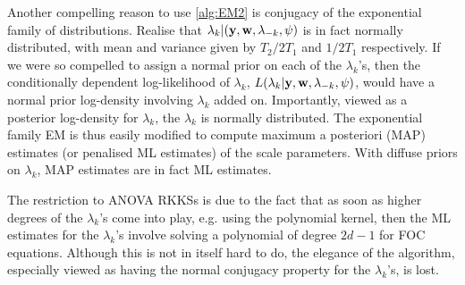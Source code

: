 \begin{remark}
  Another compelling reason to use \cref{alg:EM2} is conjugacy of the exponential family of distributions.
  Realise that $\lambda_k|({\mathbf y},{\mathbf w},\lambda_{-k},\psi)$ is in fact normally distributed, with mean and variance given by $T_2/2T_1$ and $1/2T_1$ respectively.
  If we were so compelled to assign a normal prior on each of the $\lambda_k$'s, then the conditionally dependent log-likelihood of $\lambda_k$, $L(\lambda_k|{\mathbf y},{\mathbf w},\lambda_{-k},\psi)$, would have a normal prior log-density involving $\lambda_k$ added on.
  Importantly, viewed as a posterior log-density for $\lambda_k$, the $\lambda_k$ is normally distributed.
  The exponential family EM is thus easily modified to compute maximum a posteriori (MAP) estimates (or penalised ML estimates) of the scale parameters.
  With diffuse priors on $\lambda_k$, MAP estimates are in fact ML estimates.
\end{remark}

\begin{remark}
  The restriction to ANOVA RKKSs is due to the fact that as soon as higher degrees of the $\lambda_k$'s come into play, e.g. using the polynomial kernel, then the ML estimates for the $\lambda_k$'s involve solving a polynomial of degree $2d-1$ for FOC equations.
  Although this is not in itself hard to do, the elegance of the algorithm, especially viewed as having the normal conjugacy property for the $\lambda_k$'s, is lost.
\end{remark}

%
%
